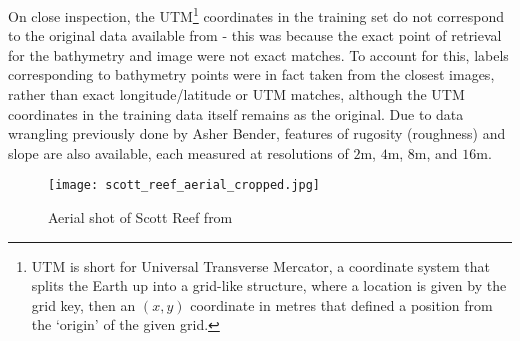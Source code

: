 On close inspection, the UTM\footnote{UTM is short for Universal Transverse Mercator, a coordinate system that splits the Earth up into a grid-like structure, where a location is given by the grid key, then an $(x,y)$ coordinate in metres that defined a position from the `origin' of the given grid.} coordinates in the training set do not correspond to the original data available from \cite{squidle} - this was because the exact point of retrieval for the bathymetry and image were not exact matches. To account for this, labels corresponding to bathymetry points were in fact taken from the closest images, rather than exact longitude/latitude or UTM matches, although the UTM coordinates in the training data itself remains as the original. Due to data wrangling previously done by Asher Bender, features of rugosity (roughness) and slope are also available, each measured at resolutions of $2$m, $4$m, $8$m, and $16$m.

\begin{figure}
    \texttt{[image: scott\_reef\_aerial\_cropped.jpg]}
    \caption{Aerial shot of Scott Reef from \cite{NASA:SRI}}
    \label{fig:scottreefaerial}
\end{figure}








